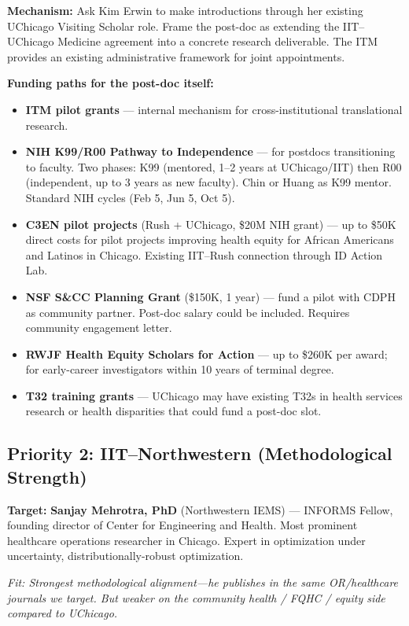 \documentclass[11pt]{article}
\begin{document}
\textbf{Mechanism:} Ask Kim Erwin to make introductions through her existing UChicago Visiting Scholar role. Frame the post-doc as extending the IIT--UChicago Medicine agreement into a concrete research deliverable. The ITM provides an existing administrative framework for joint appointments.

\textbf{Funding paths for the post-doc itself:}
\begin{itemize}[nosep]
    \item \textbf{ITM pilot grants} --- internal mechanism for cross-institutional translational research.
    \item \textbf{NIH K99/R00 Pathway to Independence} --- for postdocs transitioning to faculty. Two phases: K99 (mentored, 1--2 years at UChicago/IIT) then R00 (independent, up to 3 years as new faculty). Chin or Huang as K99 mentor. Standard NIH cycles (Feb 5, Jun 5, Oct 5).
    \item \textbf{C3EN pilot projects} (Rush + UChicago, \$20M NIH grant) --- up to \$50K direct costs for pilot projects improving health equity for African Americans and Latinos in Chicago. Existing IIT--Rush connection through ID Action Lab.
    \item \textbf{NSF S\&CC Planning Grant} (\$150K, 1 year) --- fund a pilot with CDPH as community partner. Post-doc salary could be included. Requires community engagement letter.
    \item \textbf{RWJF Health Equity Scholars for Action} --- up to \$260K per award; for early-career investigators within 10 years of terminal degree.
    \item \textbf{T32 training grants} --- UChicago may have existing T32s in health services research or health disparities that could fund a post-doc slot.
\end{itemize}

\subsection*{Priority 2: IIT--Northwestern (Methodological Strength)}

\textbf{Target:} \textbf{Sanjay Mehrotra, PhD} (Northwestern IEMS) --- INFORMS Fellow, founding director of Center for Engineering and Health. Most prominent healthcare operations researcher in Chicago. Expert in optimization under uncertainty, distributionally-robust optimization.

\textit{Fit: Strongest methodological alignment---he publishes in the same OR/healthcare journals we target. But weaker on the community health / FQHC / equity side compared to UChicago.}
\end{document}
